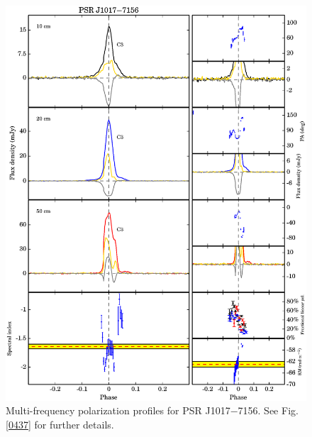 \documentclass[useAMS,usenatbib]{mn2e}
\begin{document}
\begin{appendices}
\begin{figure}
\begin{center}
\includegraphics[width=6 in]{1017.ps}
\caption{Multi-frequency polarization profiles for PSR J1017$-$7156. 
See Fig. \ref{0437} for further details.}
\label{1017}
\end{center}
\end{figure}


\end{appendices}
\end{document}
